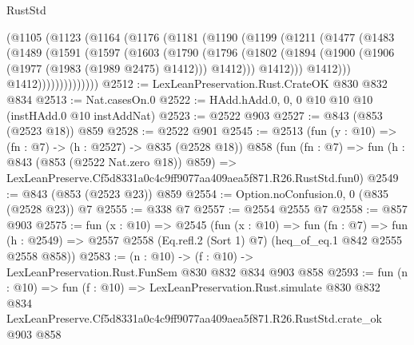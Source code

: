 \begin{lexlean}{RustStd}
\begin{coremodule}
            (@1105
              (@1123
                (@1164
                  (@1176
                    (@1181
                      (@1190
                        (@1199
                          (@1211
                            (@1477
                              (@1483
                                (@1489
                                  (@1591
                                    (@1597
                                      (@1603
                                        (@1790
                                          (@1796
                                            (@1802
                                              (@1894
                                                (@1900
                                                  (@1906 (@1977 (@1983 (@1989 @2475) @1412)))
                                                  @1412)))
                                            @1412)))
                                      @1412)))
                                @1412))))))))))))))
@2512 := LexLeanPreservation.Rust.CrateOK @830 @832 @834
@2513 := Nat.casesOn.{0}
@2522 := HAdd.hAdd.{0, 0, 0} @10 @10 @10 (instHAdd.{0} @10 instAddNat)
@2523 := @2522 @903
@2527 := @843 (@853 (@2523 @18)) @859
@2528 := @2522 @901
@2545 := @2513
    (fun (y : @10) => (fn : @7) -> (h : @2527) -> @835 (@2528 @18))
    @858
    (fun (fn : @7) =>
    fun (h : @843 (@853 (@2522 Nat.zero @18)) @859) =>
    LexLeanPreserve.Cf5d8331a0c4c9ff9077aa409aea5f871.R26.RustStd.fun0)
@2549 := @843 (@853 (@2523 @23)) @859
@2554 := Option.noConfusion.{0, 0} (@835 (@2528 @23)) @7
@2555 := @338 @7
@2557 := @2554 @2555 @7
@2558 := @857 @903
@2575 := fun (x : @10) =>
  @2545
    (fun (x : @10) =>
    fun (fn : @7) =>
    fun (h : @2549) => @2557 @2558 (Eq.refl.{2} (Sort 1) @7) (heq_of_eq.{1} @842 @2555 @2558 @858))
@2583 := (n : @10) -> (f : @10) -> LexLeanPreservation.Rust.FunSem @830 @832 @834 @903 @858
@2593 := fun (n : @10) =>
  fun (f : @10) =>
  LexLeanPreservation.Rust.simulate
    @830
    @832
    @834
    LexLeanPreserve.Cf5d8331a0c4c9ff9077aa409aea5f871.R26.RustStd.crate_ok
    @903
    @858
\end{coremodule}
\end{lexlean}
